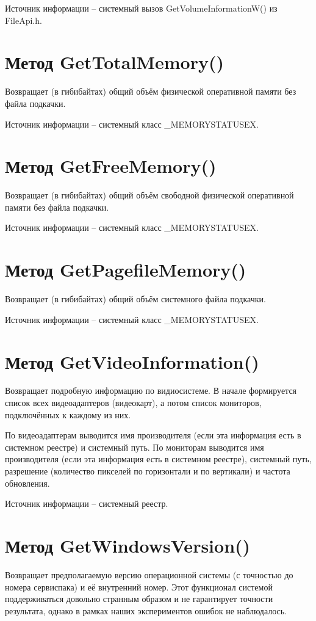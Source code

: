 \documentclass[a4paper, 12pt]{report}		%
\begin{document}
Источник информации -- системный вызов GetVolumeInformationW() из FileApi.h.

\section*{Метод GetTotalMemory()}
Возвращает (в гибибайтах) общий объём физической оперативной памяти без файла подкачки.

Источник информации -- системный класс \_MEMORYSTATUSEX.

\section*{Метод GetFreeMemory()}
Возвращает (в гибибайтах) общий объём свободной физической оперативной памяти без файла подкачки.

Источник информации -- системный класс \_MEMORYSTATUSEX.

\section*{Метод GetPagefileMemory()}
Возвращает (в гибибайтах) общий объём системного файла подкачки.

Источник информации -- системный класс \_MEMORYSTATUSEX.

\section*{Метод GetVideoInformation()}
Возвращает подробную информацию по видиосистеме. В начале формируется список всех видеоадаптеров (видеокарт), а потом список мониторов, подключённых к каждому из них.

По видеоадаптерам выводится имя производителя (если эта информация есть в системном реестре) и системный путь. По мониторам выводится имя производителя (если эта информация есть в системном реестре), системный путь, разрешение (количество пикселей по горизонтали и по вертикали) и частота обновления.

Источник информации -- системный реестр.

\section*{Метод GetWindowsVersion()}
Возвращает предполагаемую версию операционной системы (с точностью до номера сервиспака) и её внутренний номер. Этот функционал системой поддерживаться довольно странным образом и не гарантирует точности результата, однако в рамках наших экспериментов ошибок не наблюдалось.
\end{document}
